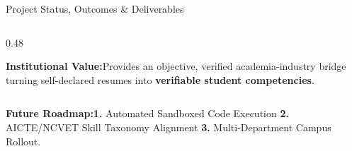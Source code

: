 \documentclass[aspectratio=169,10pt,xcolor={table,dvipsnames}]{beamer}
\begin{document}
\begin{frame}[t]{Project Status, Outcomes \& Deliverables}
\begin{columns}[T]
\begin{column}{0.48\textwidth}
      \vspace{0.08cm}

      \begin{tcolorbox}[
        enhanced,colback=LightSilver,colframe=BorderColor,
        arc=2pt,boxrule=0.7pt,
        left=5pt,right=5pt,top=2.5pt,bottom=2.5pt]
        \fontsize{6.5}{7.8}\selectfont\color{Charcoal}
        \textbf{\color{Navy}Institutional Value:}\;Provides an objective, verified academia-industry bridge turning self-declared resumes into \textbf{verifiable student competencies}.
      \end{tcolorbox}
    \end{column}
  \end{columns}

  \vspace{0.10cm}
  \begin{tcolorbox}[
    enhanced,colback=LightSilver,colframe=BorderColor,
    arc=2pt,boxrule=0.6pt,
    left=6pt,right=6pt,top=2.5pt,bottom=2.5pt]
    \centering\fontsize{6.5}{7.8}\selectfont
    \textbf{\color{Navy}Future Roadmap:}\;\textbf{1.} Automated Sandboxed Code Execution \enspace\textbullet\enspace \textbf{2.} AICTE/NCVET Skill Taxonomy Alignment \enspace\textbullet\enspace \textbf{3.} Multi-Department Campus Rollout.
  \end{tcolorbox}
\end{frame}

\end{document}
